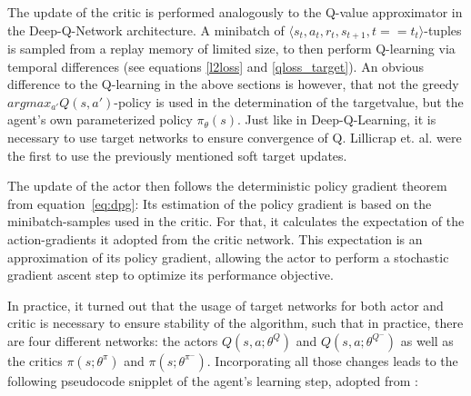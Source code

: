 The update of the critic is performed analogously to the Q-value approximator in the Deep-Q-Network architecture. A minibatch of $\langle s_t, a_t, r_t, s_{t+1}, t==t_t \rangle$-tuples is sampled from a replay memory of limited size, to then perform Q-learning via temporal differences (see equations \ref{l2loss} and \ref{qloss_target}). An obvious difference to the Q-learning in the above sections is however, that not the greedy $argmax_{a'}Q(s,a')$-policy is used in the determination of the targetvalue, but the agent's own parameterized policy $\pi_\theta(s)$. Just like in Deep-Q-Learning, it is necessary to use target networks to ensure convergence of Q. Lillicrap et. al. \cite{lillicrap_continuous_2015} were the first to use the previously mentioned soft target updates.

The update of the actor then follows the deterministic policy gradient theorem from equation~\ref{eq:dpg}: Its estimation of the policy gradient is based on the minibatch-samples used in the critic. For that, it calculates the expectation of the action-gradients it adopted from the critic network. This expectation is an approximation of its policy gradient, allowing the actor to perform a stochastic gradient ascent step to optimize its performance objective.

In practice, it turned out that the usage of target networks for both actor and critic is necessary to ensure stability of the algorithm, such that in practice, there are four different networks: the actors $Q(s,a;\theta^Q)$ and $Q(s,a;\theta^{Q^-})$ as well as the critics $\pi(s;\theta^\pi)$ and $\pi(s;\theta^{\pi^-})$. Incorporating all those changes leads to the following pseudocode snipplet of the agent's learning step, adopted from \cite{lillicrap_continuous_2015}: \\

